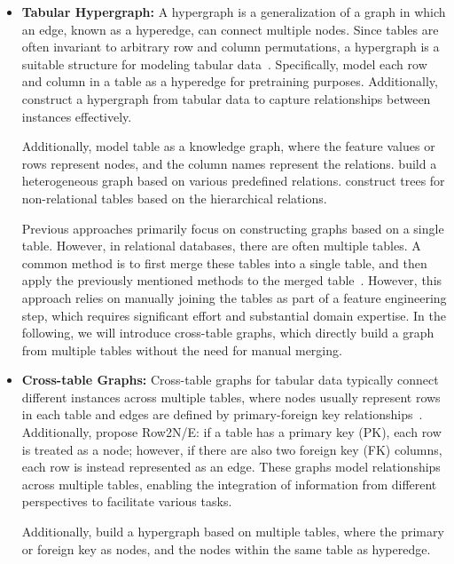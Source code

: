 \begin{itemize}[leftmargin=*]
    \item \textbf{Tabular Hypergraph:} A hypergraph is a generalization of a graph in which an edge, known as a hyperedge, can connect multiple nodes. Since tables are often invariant to arbitrary row and column permutations, a hypergraph is a suitable structure for modeling tabular data~\citep{zahradnik2023deep}. Specifically, \citet{chen2024hytrel} model each row and column in a table as a hyperedge for pretraining purposes. Additionally, \citet{du2022learning} construct a hypergraph from tabular data to capture relationships between instances effectively.

    Additionally, \citet{cvetkov2023relational} model table as a knowledge graph, where the feature values or rows represent nodes, and the column names represent the relations. \citet{zhang2020graph} build a heterogeneous graph based on various predefined relations. \citet{wang2021tuta} construct trees for non-relational tables based on the hierarchical relations. 

    Previous approaches primarily focus on constructing graphs based on a single table. However, in relational databases, there are often multiple tables. A common method is to first merge these tables into a single table, and then apply the previously mentioned methods to the merged table~\citep{kanter2015deep}. However, this approach relies on manually joining the tables as part of a feature engineering step, which requires significant effort and substantial domain expertise. In the following, we will introduce cross-table graphs, which directly build a graph from multiple tables without the need for manual merging.

    \item \textbf{Cross-table Graphs:} Cross-table graphs for tabular data typically connect different instances across multiple tables, where nodes usually represent rows in each table and edges are defined by primary-foreign key relationships~\citep{fey2023relational, cvitkovic2020supervised, zhang2023gfs}. Additionally,\citet{wang20244dbinfer} propose Row2N/E: if a table has a primary key (PK), each row is treated as a node; however, if there are also two foreign key (FK) columns, each row is instead represented as an edge. These graphs model relationships across multiple tables, enabling the integration of information from different perspectives to facilitate various tasks.

    Additionally, \citet{bai2021atj} build a hypergraph based on multiple tables, where the primary or foreign key as nodes, and the nodes within the same table as hyperedge.

\end{itemize}


